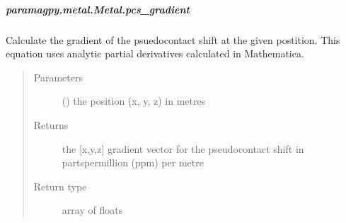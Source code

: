 \documentclass[a4paper,10pt,english,openany,oneside]{sphinxmanual}
\begin{document}
\begin{fulllineitems}
\begin{fulllineitems}
\begin{fulllineitems}
\begin{sphinxVerbatim}[commandchars=\\\{\}]
  
\PYG{p}{[}\PYG{p}{]}
\end{sphinxVerbatim}

\end{fulllineitems}



\subparagraph{paramagpy.metal.Metal.pcs\_gradient}
\label{\detokenize{reference/generated/paramagpy.metal.Metal.pcs_gradient:paramagpy-metal-metal-pcs-gradient}}\label{\detokenize{reference/generated/paramagpy.metal.Metal.pcs_gradient::doc}}

\begin{fulllineitems}
\label{\detokenize{reference/generated/paramagpy.metal.Metal.pcs_gradient:paramagpy.metal.Metal.pcs_gradient}}
\sphinxAtStartPar
Calculate the gradient of the psuedo\sphinxhyphen{}contact shift
at the given postition.
This equation uses analytic partial derivatives calculated in
Mathematica.
\begin{quote}\begin{description}
\item[{Parameters}] \leavevmode
\sphinxAtStartPar
{} () \textendash{} the position (x, y, z) in metres

\item[{Returns}] \leavevmode
\sphinxAtStartPar
{} \textendash{} the {[}x,y,z{]} gradient vector for the pseudo\sphinxhyphen{}contact shift
in parts\sphinxhyphen{}per\sphinxhyphen{}million (ppm) per metre

\item[{Return type}] \leavevmode
\sphinxAtStartPar
array of floats


\end{description}
\end{quote}
\end{fulllineitems}
\end{fulllineitems}
\end{fulllineitems}
\end{document}
